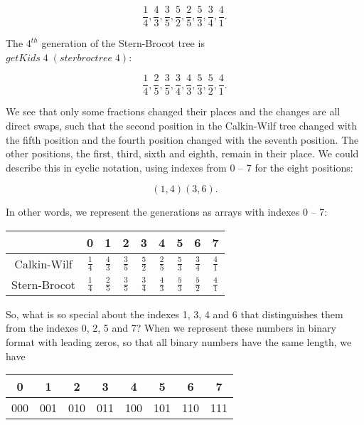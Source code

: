 \documentclass[tikz]{scrreprt}
\newcommand{\Varid}[1]{\mathit{#1}}
\begin{document}
\[
\frac{1}{4},
\frac{4}{3},
\frac{3}{5},
\frac{5}{2},
\frac{2}{5},
\frac{5}{3},
\frac{3}{4},
\frac{4}{1}.
\]

The $4^{th}$ generation of the Stern-Brocot tree is\\
\ensuremath{\Varid{getKids}\;\mathrm{4}\;(\Varid{sterbroctree}\;\mathrm{4})}: 

\[
\frac{1}{4},
\frac{2}{5},
\frac{3}{5},
\frac{3}{4},
\frac{4}{3},
\frac{5}{3},
\frac{5}{2},
\frac{4}{1}.
\]

We see that only some fractions changed their places
and the changes are all direct swaps, such that
the second position in the Calkin-Wilf tree changed with
the fifth position and
the fourth position changed with the seventh position.
The other positions, the first, third, sixth and eighth,
remain in their place. We could describe this in 
cyclic notation, using indexes from 0 -- 7 
for the eight positions:

\[
(1,4)(3,6).
\]

In other words,
we represent the generations as arrays with indexes 0 -- 7:

\begin{center}
\begingroup
\renewcommand{\arraystretch}{1.5}
\begin{tabular}{|c|c|c|c|c|c|c|c|c|}\hline
             & 0             & 1             & 2             & 3             & 4             & 5             & 6             & 7 \\\hline\hline
Calkin-Wilf  & $\frac{1}{4}$ & $\frac{4}{3}$ & $\frac{3}{5}$ & $\frac{5}{2}$ & $\frac{2}{5}$ & $\frac{5}{3}$ & $\frac{3}{4}$ & $\frac{4}{1}$\\\hline
Stern-Brocot & $\frac{1}{4}$ & $\frac{2}{5}$ & $\frac{3}{5}$ & $\frac{3}{4}$ & $\frac{4}{3}$ & $\frac{5}{3}$ & $\frac{5}{2}$ & $\frac{4}{1}$\\\hline
\end{tabular}
\endgroup
\end{center}

So, what is so special about the indexes 1, 3, 4 and 6
that distinguishes them from the indexes 0, 2, 5 and 7?
When we represent these numbers in binary format with
leading zeros, so that all binary numbers have the same length, we have

\begin{center}
\begin{tabular}{|c|c|c|c|c|c|c|c|}\hline
0    & 1   & 2    & 3   & 4   & 5   & 6   & 7 \\\hline\hline
000  & 001 & 010  & 011 & 100 & 101 & 110 & 111\\\hline
\end{tabular}
\end{center}
\end{document}
